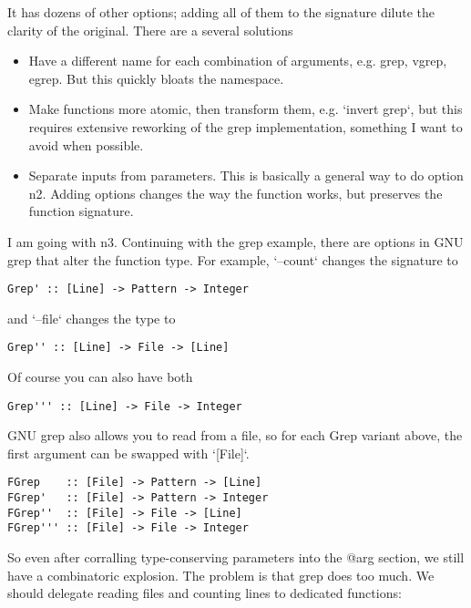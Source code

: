 \documentclass[12pt]{article}
\begin{document}
It has dozens of other options; adding all of them to the signature dilute the
clarity of the original. There are a several solutions

\begin{itemize}
 \item Have a different name for each combination of arguments, e.g. grep, vgrep,
    egrep. But this quickly bloats the namespace.
 \item Make functions more atomic, then transform them, e.g. `invert grep`, but
    this requires extensive reworking of the grep implementation, something
    I want to avoid when possible. 
 \item Separate inputs from parameters. This is basically a general way to do
    option n2. Adding options changes the way the function works, but preserves
    the function signature.
\end{itemize}

I am going with n3. Continuing with the grep example, there are options in GNU
grep that alter the function type. For example, `--count` changes the signature
to

\begin{verbatim}
Grep' :: [Line] -> Pattern -> Integer
\end{verbatim}

and `--file` changes the type to

\begin{verbatim}
Grep'' :: [Line] -> File -> [Line]
\end{verbatim}

Of course you can also have both

\begin{verbatim}
Grep''' :: [Line] -> File -> Integer
\end{verbatim}

GNU grep also allows you to read from a file, so for each Grep variant above,
the first argument can be swapped with `[File]`.

\begin{verbatim}
FGrep    :: [File] -> Pattern -> [Line]
FGrep'   :: [File] -> Pattern -> Integer
FGrep''  :: [File] -> File -> [Line]
FGrep''' :: [File] -> File -> Integer
\end{verbatim}

So even after corralling type-conserving parameters into the @arg section, we
still have a combinatoric explosion. The problem is that grep does too much. We
should delegate reading files and counting lines to dedicated functions:
\end{document}
